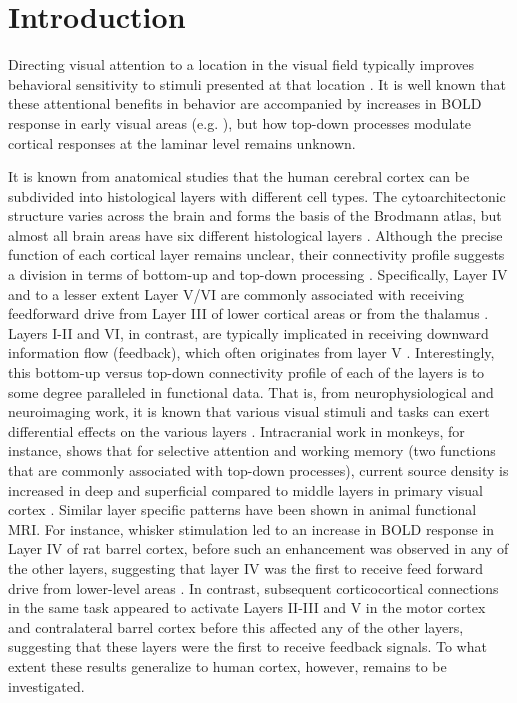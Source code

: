\section{Introduction}
Directing visual attention to a location in the visual field typically improves behavioral sensitivity to stimuli presented at that location \cite{Posner1980,Lee1997,Yeshurun1998,Carrasco2004,Baldassi2005,Ling2009}. It is well known that these attentional benefits in behavior are accompanied by increases in BOLD response in early visual areas (e.g. \cite{Brefczynski1999,Gandhi1999,Kastner1999}), but how top-down processes modulate cortical responses at the laminar level remains unknown.

It is known from anatomical studies that the human cerebral cortex can be subdivided into histological layers with different cell types. The cytoarchitectonic structure varies across the brain and forms the basis of the Brodmann atlas, but almost all brain areas have six different histological layers \cite{Brodmann1909}. Although the precise function of each cortical layer remains unclear, their connectivity profile suggests a division in terms of bottom-up and top-down processing \cite{Felleman1991}. Specifically, Layer IV and to a lesser extent Layer V/VI are commonly associated with receiving feedforward drive from Layer III of lower cortical areas or from the thalamus \cite{Jones1998,Constantinople2013}. Layers I-II and VI, in contrast, are typically implicated in receiving downward information flow (feedback), which often originates from layer V \cite{Alitto2003}. Interestingly, this bottom-up versus top-down connectivity profile of each of the layers is to some degree paralleled in functional data. That is, from neurophysiological and neuroimaging work, it is known that various visual stimuli and tasks can exert differential effects on the various layers \cite{Maier2010,Xing2012,Self2013,VelezFort2014, OHerron2016}. Intracranial work in monkeys, for instance, shows that for selective attention and working memory (two functions that are commonly associated with top-down processes), current source density is increased in deep and superficial compared to middle layers in primary visual cortex \cite{VanKerkoerle2017}. Similar layer specific patterns have been shown in animal functional MRI. For instance, whisker stimulation led to an increase in BOLD response in Layer IV of rat barrel cortex, before such an enhancement was observed in any of the other layers, suggesting that layer IV was the first to receive feed forward drive from lower-level areas \cite{Yu2014}. In contrast, subsequent corticocortical connections in the same task appeared to activate Layers II-III and V in the motor cortex and contralateral barrel cortex before this affected any of the other layers, suggesting that these layers were the first to receive feedback signals. To what extent these results generalize to human cortex, however, remains to be investigated.

